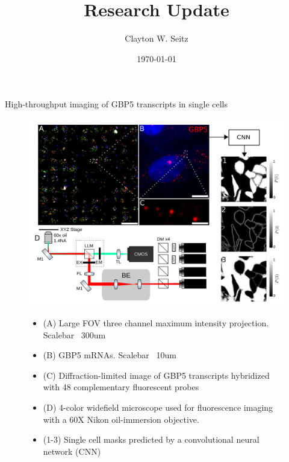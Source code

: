 \documentclass{beamer}					%
\title{Research Update}	%
\author{Clayton W. Seitz}								%
\date{\today}									%
\begin{document}
\begin{frame}
  \titlepage
\end{frame}


%


\begin{frame}{High-throughput imaging of GBP5 transcripts in single cells}
\begin{figure}
\includegraphics[width=11.5cm]{Figure-1.png}
\begin{itemize}
\item {\fontsize{8pt}{16.8pt}\selectfont (A) Large FOV three channel maximum intensity projection. Scalebar ~300um }
\item {\fontsize{8pt}{16.8pt}\selectfont (B)  GBP5 mRNAs. Scalebar ~10um }
\item {\fontsize{8pt}{16.8pt}\selectfont (C) Diffraction-limited image of GBP5 transcripts hybridized with 48 complementary fluorescent probes }
\item {\fontsize{8pt}{16.8pt}\selectfont (D) 4-color widefield microscope used for fluorescence imaging with a 60X Nikon oil-immersion objective.}
\item {\fontsize{8pt}{16.8pt}\selectfont (1-3) Single cell masks predicted by a convolutional neural network (CNN)}
\end{itemize}
\end{figure}
\end{frame}
\end{document}
